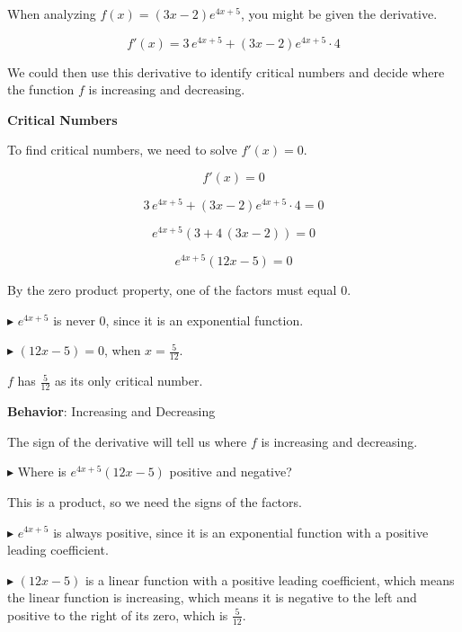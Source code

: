 \documentclass{ximera}
\begin{document}
\begin{example}

When analyzing $f(x) = (3x - 2) e^{4x + 5}$, you might be given the derivative.


\[
f'(x) = 3 \, e^{4x + 5} + (3x - 2) e^{4x + 5} \cdot 4
\]


We could then use this derivative to identify critical numbers and decide where the function $f$ is increasing and decreasing.




\textbf{Critical Numbers} 


To find critical numbers, we need to solve $f'(x) = 0$. 


\[
f'(x) = 0
\]


\[
3 \, e^{4x + 5} + (3x - 2) e^{4x + 5} \cdot 4 = 0
\]


\[
e^{4x + 5}  (3 + 4 \, (3x - 2)) = 0
\]


\[
e^{4x + 5}  (12x - 5) = 0
\]



By the zero product property, one of the factors must equal $0$. 



$\blacktriangleright$ $e^{4x + 5}$ is never $0$, since it is an exponential function. 


$\blacktriangleright$ $(12x - 5) = 0$, when $x = \frac{5}{12}$. 



$f$ has $\frac{5}{12}$ as its only critical number. 




\textbf{Behavior}: Increasing and Decreasing 



The sign of the derivative will tell us where $f$ is increasing and decreasing. 


\textbf{\textcolor{blue!55!black}{$\blacktriangleright$}} Where is $e^{4x + 5}  (12x - 5)$ positive and negative?


This is a product, so we need the signs of the factors. 


$\blacktriangleright$  $e^{4x + 5}$ is always positive, since it is an exponential function with a positive leading coefficient. 


$\blacktriangleright$ $(12x - 5)$ is a linear function with a positive leading coefficient, which means the linear function is increasing, which means it is negative to the left and positive to the right of its zero, which is $\frac{5}{12}$. 




\end{example}
\end{document}
